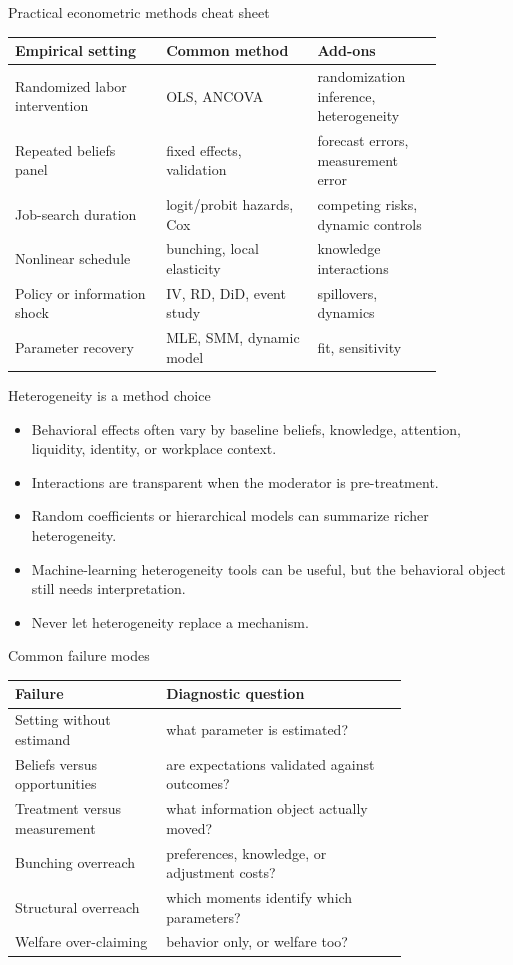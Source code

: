 \documentclass[aspectratio=169,11pt]{beamer}
\begin{document}
\begin{frame}{Practical econometric methods cheat sheet}
\scriptsize
\begin{tabular}{p{0.30\linewidth} p{0.30\linewidth} p{0.25\linewidth}}
\toprule
Empirical setting & Common method & Add-ons \\
\midrule
Randomized labor intervention & OLS, ANCOVA & randomization inference, heterogeneity \\
Repeated beliefs panel & fixed effects, validation & forecast errors, measurement error \\
Job-search duration & logit/probit hazards, Cox & competing risks, dynamic controls \\
Nonlinear schedule & bunching, local elasticity & knowledge interactions \\
Policy or information shock & IV, RD, DiD, event study & spillovers, dynamics \\
Parameter recovery & MLE, SMM, dynamic model & fit, sensitivity \\
\bottomrule
\end{tabular}
\end{frame}

\begin{frame}{Heterogeneity is a method choice}
\begin{itemize}
    \item Behavioral effects often vary by baseline beliefs, knowledge, attention, liquidity, identity, or workplace context.
    \item Interactions are transparent when the moderator is pre-treatment.
    \item Random coefficients or hierarchical models can summarize richer heterogeneity.
    \item Machine-learning heterogeneity tools can be useful, but the behavioral object still needs interpretation.
    \item Never let heterogeneity replace a mechanism.
\end{itemize}
\end{frame}

\begin{frame}{Common failure modes}
\small
\begin{tabular}{p{0.30\linewidth} p{0.48\linewidth}}
\toprule
Failure & Diagnostic question \\
\midrule
Setting without estimand & what parameter is estimated? \\
Beliefs versus opportunities & are expectations validated against outcomes? \\
Treatment versus measurement & what information object actually moved? \\
Bunching overreach & preferences, knowledge, or adjustment costs? \\
Structural overreach & which moments identify which parameters? \\
Welfare over-claiming & behavior only, or welfare too? \\
\bottomrule
\end{tabular}
\end{frame}
\end{document}
